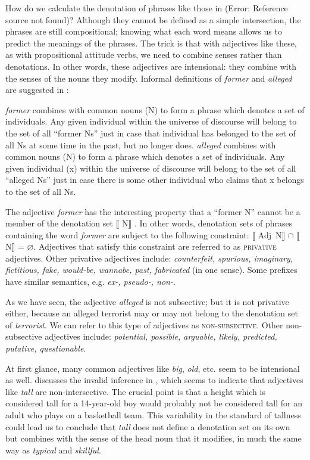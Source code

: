 How do we calculate the denotation of phrases like those in (Error: Reference source not found)? Although they cannot be defined as a simple intersection, the phrases are still compositional; knowing what each word means allows us to predict the meanings of the phrases. The trick is that with adjectives like these, as with propositional attitude verbs, we need to combine senses rather than denotations. In other words, these adjectives are intensional: they combine with the senses of the nouns they modify. Informal definitions of \textit{former} and \textit{alleged} are suggested in :


\ea
\ea  \textit{former} combines with common nouns (N) to form a phrase which denotes a set of individuals. Any given individual within the universe of discourse will belong to the set of all “former Ns” just in case that individual has belonged to the set of all Ns at some time in the past, but no longer does.
\ex  \textit{alleged} combines with common nouns (N) to form a phrase which denotes a set of individuals. Any given individual (x) within the universe of discourse will belong to the set of all “alleged Ns” just in case there is some other individual who claims that x belongs to the set of all Ns.
\z \z


The adjective \textit{former} has the interesting property that a “former N” cannot be a member of the denotation set $\llbracket$ N$\rrbracket$ . In other words, denotation sets of phrases containing the word \textit{former} are subject to the following constraint: $\llbracket$ Adj~N$\rrbracket$  ${\cap}$ $\llbracket$ N$\rrbracket$  = ⌀. Adjectives that satisfy this constraint are referred to as \textsc{privative} adjectives. Other privative adjectives include: \textit{counterfeit, spurious, imaginary, fictitious, fake, would-be, wannabe, past, fabricated} (in one sense). Some prefixes have similar semantics, e.g. \textit{ex-, pseudo-, non-}.



As we have seen, the adjective \textit{alleged} is not subsective; but it is not privative either, because an alleged terrorist may or may not belong to the denotation set of \textit{terrorist}. We can refer to this type of adjectives as \textsc{non-subsective}. Other non-subsective adjectives include: \textit{potential, possible, arguable, likely, predicted, putative, questionable}.



At first glance, many common adjectives like \textit{big}, \textit{old}, etc. seem to be intensional as well. \citet{Partee1995} discusses the invalid inference in , which seems to indicate that adjectives like \textit{tall} are non-intersective. The crucial point is that a height which is considered tall for a 14-year-old boy would probably not be considered tall for an adult who plays on a basketball team. This variability in the standard of tallness could lead us to conclude that \textit{tall} does not define a denotation set on its own but combines with the sense of the head noun that it modifies, in much the same way as \textit{typical} and \textit{skillful}.



